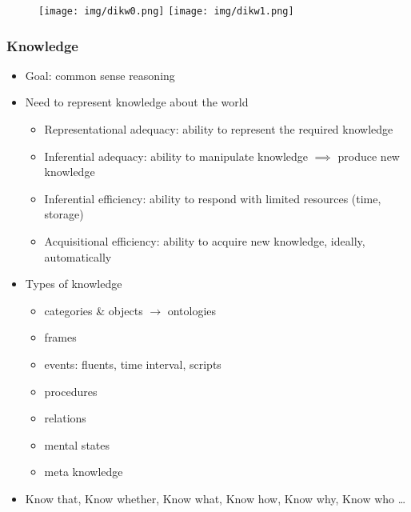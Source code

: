 \documentclass[UTF8,11pt,colorlinks,compress,openany]{beamer}%
\begin{document}
\begin{frame}\frametitle{}
\begin{figure}[H]
\texttt{[image: img/dikw0.png]}
\texttt{[image: img/dikw1.png]}
\end{figure}
\end{frame}

\begin{frame}\frametitle{Knowledge}
\begin{itemize}
	\item Goal: common sense reasoning
	\item Need to represent knowledge about the world
	\begin{itemize}
		\item Representational adequacy: ability to represent the required knowledge
		\item Inferential adequacy: ability to manipulate knowledge $\implies$ produce new knowledge
		\item Inferential efficiency: ability to respond with limited resources (time, storage)
		\item Acquisitional efficiency: ability to acquire new knowledge, ideally, automatically
	\end{itemize}
	\item Types of knowledge
	\begin{itemize}
		\item categories \& objects $\to$ ontologies
		\item frames
		\item events: fluents, time interval, scripts
		\item procedures
		\item relations
		\item mental states
		\item meta knowledge
	\end{itemize}
	\item Know that, Know whether, Know what, Know how, Know why, Know who \dots
\end{itemize}
\end{frame}
\end{document}
